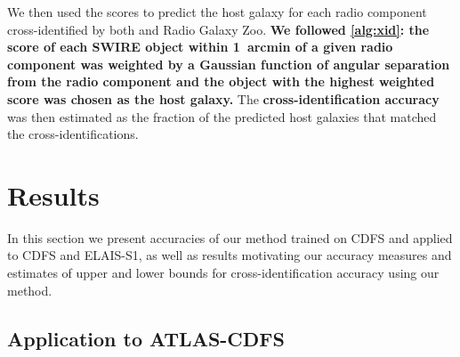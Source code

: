 \documentclass[fleqn,usenatbib,usedcolumn]{mnras}
\newcommand{\edited}[1]{{\bf {#1}}}
\begin{document}
    We then used the scores to predict the host galaxy
    for each radio component cross-identified by both \citet{norris06} and
    Radio Galaxy Zoo. \edited{We followed \autoref{alg:xid}:
    the score of each SWIRE object within 1~arcmin of a given radio
    component was weighted by a Gaussian function of angular separation from the
    radio component and the object with the highest
    weighted score was chosen as the host galaxy.} The
    \edited{cross-identification accuracy} was then estimated as the
    fraction of the predicted host galaxies that matched the \citet{norris06}
    cross-identifications.

\section{Results}\label{sec:results}

  In this section we present accuracies of our method trained on CDFS and
  applied to CDFS and ELAIS-S1, as well as results motivating our accuracy
  measures and estimates of upper and lower bounds for cross-identification
  accuracy using our method.

  \subsection{Application to ATLAS-CDFS}
  \label{sec:cdfs-results}
\end{document}
